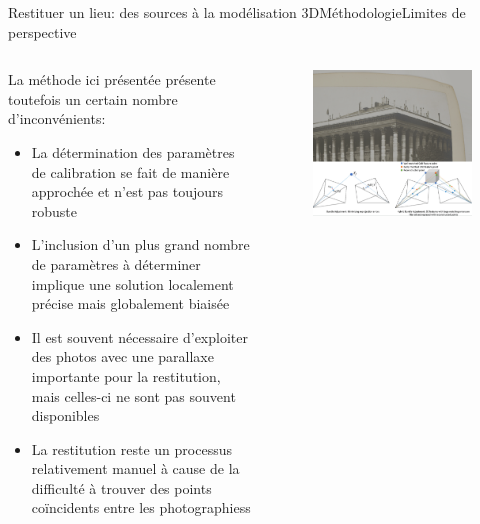 \documentclass[8pt]{beamer}
\begin{document}
\begin{frame}{Restituer un lieu: des sources à la modélisation 3D}{Méthodologie}{Limites de perspective}
	\begin{columns}[c]
		\begin{column}{0.5\textwidth}
			La méthode ici présentée présente toutefois un certain nombre d’inconvénients:
			\begin{itemize}
				\item La détermination des paramètres de calibration se fait de manière approchée et n’est pas toujours robuste
				\item L’inclusion d’un plus grand nombre de paramètres à déterminer implique une solution localement précise mais globalement biaisée
				\item Il est souvent nécessaire d’exploiter des photos avec une parallaxe importante pour la restitution, mais celles-ci ne sont pas souvent disponibles
				\item La restitution reste un processus relativement manuel à cause de la difficulté à trouver des points coïncidents entre les photographiess
			\end{itemize}
		\end{column}
		\begin{column}{0.5\textwidth}
			\begin{figure}
				\includegraphics[width=\textwidth]{includes/c_slide10.png}
			\end{figure}
		\end{column}
	\end{columns}
\end{frame}
\end{document}
